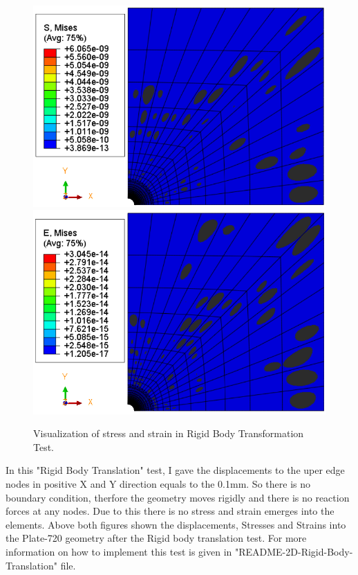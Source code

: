 \documentclass[12pt]{article}
\begin{document}
\begin{figure}[H]
	\begin{center}
		\includegraphics[scale=0.49]{Rigid_body_stress_crop.png} 
		\includegraphics[scale=0.49]{Rigid_body_strain_crop.png} 
	\end{center}
	\caption{Visualization of stress and strain in Rigid Body Transformation Test.} 
\end{figure}
\vspace{1cm}
In this "Rigid Body Translation" test, I gave the displacements to the uper edge nodes in positive X and Y direction equals to the 0.1mm. So there is no boundary condition, therfore the geometry moves rigidly and there is no reaction forces at any nodes. Due to this there is no stress and strain emerges into the elements. Above both figures shown the displacements, Stresses and Strains into the Plate-720 geometry after the Rigid body translation test. For more information on how to implement this test is given in "README-2D-Rigid-Body-Translation" file.
\newpage
\end{document}
